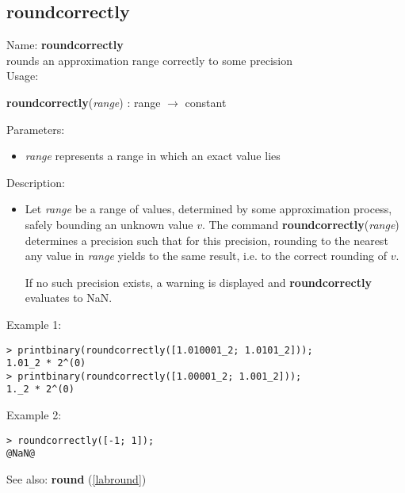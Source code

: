 \subsection{roundcorrectly}
\label{labroundcorrectly}
\noindent Name: \textbf{roundcorrectly}\\
rounds an approximation range correctly to some precision\\

\noindent Usage: 
\begin{center}
\textbf{roundcorrectly}(\emph{range}) : \textsf{range} $\rightarrow$ \textsf{constant}\\
\end{center}
Parameters: 
\begin{itemize}
\item \emph{range} represents a range in which an exact value lies
\end{itemize}
\noindent Description: \begin{itemize}

\item Let \emph{range} be a range of values, determined by some approximation
   process, safely bounding an unknown value $v$. The command
   \textbf{roundcorrectly}(\emph{range}) determines a precision such that for this precision,
   rounding to the nearest any value in \emph{range} yields to the same
   result, i.e. to the correct rounding of $v$.
    
   If no such precision exists, a warning is displayed and \textbf{roundcorrectly}
   evaluates to NaN.
\end{itemize}
\noindent Example 1: 
\begin{center}\begin{minipage}{15cm}\begin{Verbatim}[frame=single]
> printbinary(roundcorrectly([1.010001_2; 1.0101_2]));
1.01_2 * 2^(0)
> printbinary(roundcorrectly([1.00001_2; 1.001_2]));
1._2 * 2^(0)
\end{Verbatim}
\end{minipage}\end{center}
\noindent Example 2: 
\begin{center}\begin{minipage}{15cm}\begin{Verbatim}[frame=single]
> roundcorrectly([-1; 1]);
@NaN@
\end{Verbatim}
\end{minipage}\end{center}
See also: \textbf{round} (\ref{labround})
